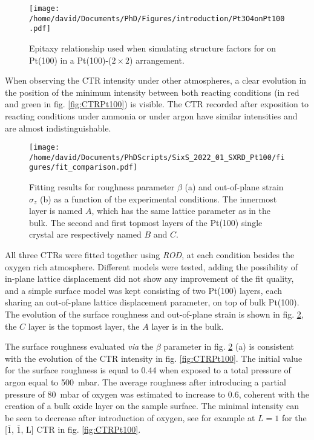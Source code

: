 \begin{figure}[!htb]
    \centering
    \texttt{[image: /home/david/Documents/PhD/Figures/introduction/Pt3O4onPt100.pdf]}
    \caption{
    Epitaxy relationship used when simulating structure factors for  on Pt(100) in a Pt(100)-($2\times2$) arrangement.
    }
    \label{fig:Pt3O4onPt100}
\end{figure}

When observing the CTR intensity under other atmospheres, a clear evolution in the position of the minimum intensity between both reacting conditions (in red and green in fig. \ref{fig:CTRPt100}) is visible.
The CTR recorded after exposition to reacting conditions under ammonia or under argon have similar intensities and are almost indistinguishable.

\begin{figure}[!htb]
    \centering
    \texttt{[image: /home/david/Documents/PhDScripts/SixS\_2022\_01\_SXRD\_Pt100/figures/fit\_comparison.pdf]}
    \caption{
        Fitting results for roughness parameter $\beta$ (a) and out-of-plane strain $\sigma_z$ (b) as a function of the experimental conditions.
        The innermost layer is named $A$, which has the same lattice parameter as in the bulk.
        The second and first topmost layers of the Pt(100) single crystal are respectively named $B$ and $C$.
    }
    \label{fig:CTRFit100}
\end{figure}

All three CTRs were fitted together using \textit{ROD}, at each condition besides the oxygen rich atmosphere.
Different models were tested, adding the possibility of in-plane lattice displacement did not show any improvement of the fit quality, and a simple surface model was kept consisting of two Pt(100) layers, each sharing an out-of-plane lattice displacement parameter, on top of bulk Pt(100).
The evolution of the surface roughness and out-of-plane strain is shown in fig. \ref{fig:CTRFit100}, the $C$ layer is the topmost layer, the $A$ layer is in the bulk.

The surface roughness evaluated \textit{via} the $\beta$ parameter in fig. \ref{fig:CTRFit100} (a) is consistent with the evolution of the CTR intensity in fig. \ref{fig:CTRPt100}.
The initial value for the surface roughness is equal to \num{0.44} when exposed to a total pressure of argon equal to \qty{500}{\milli\bar}.
The average roughness after introducing a partial pressure of \qty{80}{\milli\bar} of oxygen was estimated to increase to \num{0.6}, coherent with the creation of a bulk oxide layer on the sample surface.
The minimal intensity can be seen to decrease after introduction of oxygen, see for example at $L=1$ for the [$\bar{1}$, $\bar{1}$, L] CTR in fig. \ref{fig:CTRPt100}.

